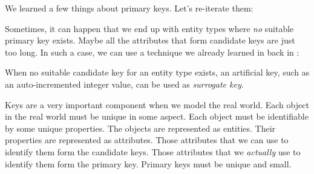 We learned a few things about primary keys.
Let's re-iterate them:%
%
%

Sometimes, it can happen that we end up with entity types where \emph{no} suitable primary key exists.
Maybe all the attributes that form candidate keys are just too long.
In such a case, we can use a technique we already learned in back in :%
%
\begin{definition}%
\label{def:surrogateKey}%
When no suitable candidate key for an entity type exists, an artificial key, such as an auto-incremented integer value, can be used as \emph{surrogate key}.%
\end{definition}%
%
Keys are a very important component when we model the real world.
Each object in the real world must be unique in some aspect.
Each object must be identifiable by some unique properties.
The objects are represented as entities.
Their properties are represented as attributes.
Those attributes that we can use to identify them form the candidate keys.
Those attributes that we \emph{actually} use to identify them form the primary key.
Primary keys must be unique and small.%
\FloatBarrier%
\endhsection%
%
